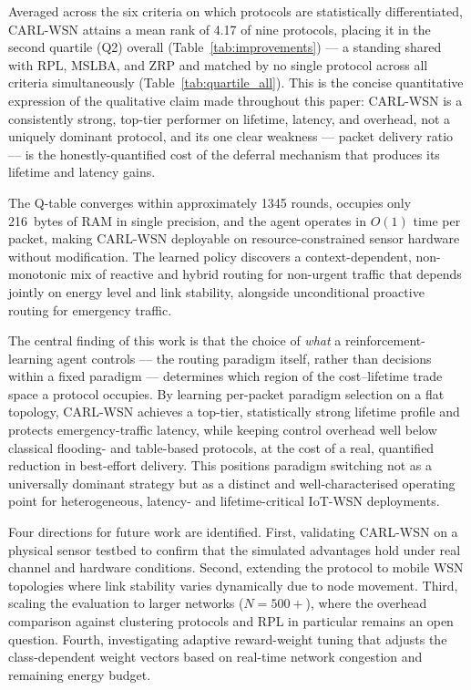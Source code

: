 \documentclass[12pt]{article}
\begin{document}
Averaged across the six criteria on which protocols are
statistically differentiated, CARL-WSN attains a mean rank of 4.17
of nine protocols, placing it in the second quartile (Q2) overall
(Table~\ref{tab:improvements}) --- a standing shared with RPL, MSLBA,
and ZRP and matched by no single protocol across all criteria
simultaneously (Table~\ref{tab:quartile_all}). This is the concise
quantitative expression of the qualitative claim made throughout
this paper: CARL-WSN is a consistently strong, top-tier performer on
lifetime, latency, and overhead, not a uniquely dominant protocol,
and its one clear weakness --- packet delivery ratio --- is the
honestly-quantified cost of the deferral mechanism that produces its
lifetime and latency gains.

The Q-table converges within approximately 1345 rounds, occupies
only 216~bytes of RAM in single precision, and the agent operates in
$O(1)$ time per packet, making CARL-WSN deployable on
resource-constrained sensor hardware without modification. The
learned policy discovers a context-dependent, non-monotonic mix of
reactive and hybrid routing for non-urgent traffic that depends
jointly on energy level and link stability, alongside unconditional
proactive routing for emergency traffic.

The central finding of this work is that the choice of \emph{what} a
reinforcement-learning agent controls --- the routing paradigm
itself, rather than decisions within a fixed paradigm --- determines
which region of the cost--lifetime trade space a protocol occupies.
By learning per-packet paradigm selection on a flat topology,
CARL-WSN achieves a top-tier, statistically strong lifetime profile
and protects emergency-traffic latency, while keeping control
overhead well below classical flooding- and table-based protocols,
at the cost of a real, quantified reduction in best-effort delivery.
This positions paradigm switching not as a universally dominant
strategy but as a distinct and well-characterised operating point
for heterogeneous, latency- and lifetime-critical IoT-WSN
deployments.

Four directions for future work are identified. First, validating
CARL-WSN on a physical sensor testbed to confirm that the simulated
advantages hold under real channel and hardware conditions. Second,
extending the protocol to mobile WSN topologies where link stability
varies dynamically due to node movement. Third, scaling the
evaluation to larger networks ($N = 500{+}$), where the overhead
comparison against clustering protocols and RPL in particular
remains an open question. Fourth, investigating adaptive
reward-weight tuning that adjusts the class-dependent weight vectors
based on real-time network congestion and remaining energy budget.
\end{document}

